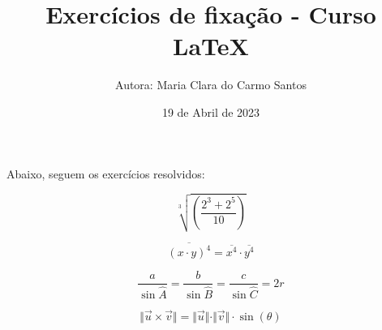 \documentclass[a4paper, 12pt]{article}
\title{Exercícios de fixação - Curso LaTeX}
\author{Autora: Maria Clara do Carmo Santos}
\date{19 de Abril de 2023}
\begin{document}
\maketitle

Abaixo, seguem os exercícios resolvidos:

\begin{equation}
\sqrt[3]{\left(\frac{2^3+2^5}{10}\right)}
\end{equation}

\begin{equation}
\overline{(x\cdot y)^4} = \overline{x^4}\cdot \overline{y^4}
\end{equation}

\begin{equation}
\frac{a}{\sin \widehat{A}} = \frac{b}{\sin \widehat{B}} = \frac{c}{\sin \widehat{C}} = 2r
\end{equation}

\begin{equation}
\Vert\vec{u}\times \vec{v} \Vert = \Vert \vec{u} \Vert \cdot \Vert \vec{v} \Vert \cdot \sin(\theta)
\end{equation}
\end{document}
